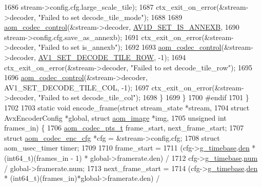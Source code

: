 \begin{DoxyCodeInclude}
{{{{{{{{{{{{{{{{{{{{{{{{{{{{{{{{{{{{{1686           stream->config.cfg.large\_scale\_tile);
1687       ctx\_exit\_on\_error(&stream->decoder, \textcolor{stringliteral}{"Failed to set decode\_tile\_mode"});
1688 
1689       \hyperlink{group__codec_ga6da974f4eeaba1fa74106b28d0fe6ac5}{aom\_codec\_control}(&stream->decoder, \hyperlink{group__aom__decoder_gga3865fd4b3192489baa9a5c3632ebe97ba1fb269c5c5913d9995b6c35d28e2a788}{AV1D\_SET\_IS\_ANNEXB},
1690           stream->config.cfg.save\_as\_annexb);
1691       ctx\_exit\_on\_error(&stream->decoder, \textcolor{stringliteral}{"Failed to set is\_annexb"});
1692 
1693       \hyperlink{group__codec_ga6da974f4eeaba1fa74106b28d0fe6ac5}{aom\_codec\_control}(&stream->decoder, 
      \hyperlink{group__aom__decoder_gga3865fd4b3192489baa9a5c3632ebe97bac056b4cf80427fd05e3c4c9fc46edb78}{AV1\_SET\_DECODE\_TILE\_ROW}, -1);
1694       ctx\_exit\_on\_error(&stream->decoder, \textcolor{stringliteral}{"Failed to set decode\_tile\_row"});
1695 
1696       \hyperlink{group__codec_ga6da974f4eeaba1fa74106b28d0fe6ac5}{aom\_codec\_control}(&stream->decoder, AV1\_SET\_DECODE\_TILE\_COL, -1);
1697       ctx\_exit\_on\_error(&stream->decoder, \textcolor{stringliteral}{"Failed to set decode\_tile\_col"});
1698     \}
1699   \}
1700 \textcolor{preprocessor}{#endif}
1701 \}
1702 
1703 \textcolor{keyword}{static} \textcolor{keywordtype}{void} encode\_frame(\textcolor{keyword}{struct} stream\_state *stream,
1704     \textcolor{keyword}{struct} AvxEncoderConfig *global, \textcolor{keyword}{struct} \hyperlink{structaom__image}{aom\_image} *img,
1705     \textcolor{keywordtype}{unsigned} \textcolor{keywordtype}{int} frames\_in) \{
1706   \hyperlink{group__encoder_ga958524226c9a65251c9e4f7bb78fc606}{aom\_codec\_pts\_t} frame\_start, next\_frame\_start;
1707   \textcolor{keyword}{struct }\hyperlink{structaom__codec__enc__cfg}{aom\_codec\_enc\_cfg} *cfg = &stream->config.cfg;
1708   \textcolor{keyword}{struct }aom\_usec\_timer timer;
1709 
1710   frame\_start =
1711       (cfg->\hyperlink{structaom__codec__enc__cfg_a10664f1fc5b6ec29b77ee13efeeecdf7}{g\_timebase}.\hyperlink{structaom__rational_adeddf2ea01c12b7be66536e0a0fb92c5}{den} * (int64\_t)(frames\_in - 1) * global->framerate.den) /
1712       cfg->\hyperlink{structaom__codec__enc__cfg_a10664f1fc5b6ec29b77ee13efeeecdf7}{g\_timebase}.\hyperlink{structaom__rational_a7b48174411798c780a15f132c4650839}{num} / global->framerate.num;
1713   next\_frame\_start =
1714       (cfg->\hyperlink{structaom__codec__enc__cfg_a10664f1fc5b6ec29b77ee13efeeecdf7}{g\_timebase}.\hyperlink{structaom__rational_adeddf2ea01c12b7be66536e0a0fb92c5}{den} * (int64\_t)(frames\_in)*global->framerate.den) /
}}}}}}}}}}}}}}}}}}}}}}}}}}}}}}}}}}}}}
\end{DoxyCodeInclude}

